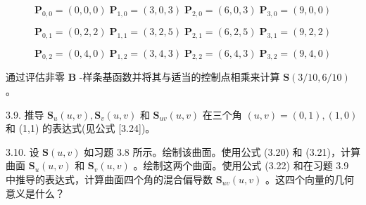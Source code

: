 \documentclass[../main.tex]{subfiles}
\begin{document}
\[
{\mathbf{P}}_{0,0} = \left( {0,0,0}\right) \;{\mathbf{P}}_{1,0} = \left( {3,0,3}\right) \;{\mathbf{P}}_{2,0} = \left( {6,0,3}\right) \;{\mathbf{P}}_{3,0} = \left( {9,0,0}\right)
\]

\[
{\mathbf{P}}_{0,1} = \left( {0,2,2}\right) \;{\mathbf{P}}_{1,1} = \left( {3,2,5}\right) \;{\mathbf{P}}_{2,1} = \left( {6,2,5}\right) \;{\mathbf{P}}_{3,1} = \left( {9,2,2}\right)
\]

\[
{\mathbf{P}}_{0,2} = \left( {0,4,0}\right) \;{\mathbf{P}}_{1,2} = \left( {3,4,3}\right) \;{\mathbf{P}}_{2,2} = \left( {6,4,3}\right) \;{\mathbf{P}}_{3,2} = \left( {9,4,0}\right)
\]

通过评估非零 \(\mathbf{B}\) -样条基函数并将其与适当的控制点相乘来计算 \(\mathbf{S}\left( {3/{10},6/{10}}\right)\) 。

3.9. 推导 \({\mathbf{S}}_{u}\left( {u,v}\right) ,{\mathbf{S}}_{v}\left( {u,v}\right)\) 和 \({\mathbf{S}}_{uv}\left( {u,v}\right)\) 在三个角 \(\left( {u,v}\right)  = \left( {0,1}\right) ,\left( {1,0}\right)\) 和 (1,1) 的表达式(见公式 [3.24])。

3.10. 设 \(\mathbf{S}\left( {u,v}\right)\) 如习题 3.8 所示。绘制该曲面。使用公式 (3.20) 和 (3.21)，计算曲面 \({\mathbf{S}}_{u}\left( {u,v}\right)\) 和 \({\mathbf{S}}_{v}\left( {u,v}\right)\) 。绘制这两个曲面。使用公式 (3.22) 和在习题 3.9 中推导的表达式，计算曲面四个角的混合偏导数 \({\mathbf{S}}_{uv}\left( {u,v}\right)\) 。这四个向量的几何意义是什么？




\clearpage
\end{document}
